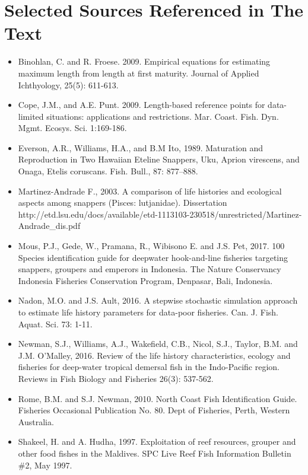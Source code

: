 \section{Selected Sources Referenced in The Text}
\begin{itemize}[noitemsep,topsep=0pt,parsep=0pt,partopsep=0pt]
\item Binohlan, C. and R. Froese. 2009. Empirical equations for estimating maximum length from length at first maturity. Journal of Applied Ichthyology, 25(5): 611-613.
\item Cope, J.M., and A.E. Punt. 2009. Length-based reference points for data-limited situations: applications and restrictions. Mar. Coast. Fish. Dyn. Mgmt. Ecosys. Sci. 1:169-186.
\item Everson, A.R., Williams, H.A., and B.M Ito, 1989. Maturation and Reproduction in Two Hawaiian Eteline Snappers, Uku, Aprion virescens, and Onaga, Etelis coruscans. Fish. Bull., 87: 877--888.
\item Martinez-Andrade F., 2003. A comparison of life histories and ecological aspects among snappers (Pisces: lutjanidae). Dissertation http://etd.lsu.edu/docs/available/etd-1113103-230518/unrestricted/Martinez-Andrade\_dis.pdf
\item Mous, P.J., Gede, W., Pramana, R., Wibisono E. and J.S. Pet, 2017. 100 Species identification guide for deepwater hook-and-line fisheries targeting snappers, groupers and emperors in Indonesia. The Nature Conservancy Indonesia Fisheries Conservation Program, Denpasar, Bali, Indonesia.
\item Nadon, M.O. and J.S. Ault, 2016. A stepwise stochastic simulation approach to estimate life history parameters for data-poor fisheries. Can. J. Fish. Aquat. Sci. 73: 1-11.
\item Newman, S.J., Williams, A.J., Wakefield, C.B., Nicol, S.J., Taylor, B.M. and J.M. O'Malley, 2016.    Review of the life history characteristics, ecology and fisheries for deep-water tropical demersal fish in the Indo-Pacific region. Reviews in Fish Biology and Fisheries 26(3): 537-562.
\item Rome, B.M. and S.J. Newman, 2010. North Coast Fish Identification Guide. Fisheries Occasional Publication No. 80. Dept of Fisheries, Perth, Western Australia.
\item Shakeel, H. and A. Hudha, 1997. Exploitation of reef resources, grouper and other food fishes in the Maldives. SPC Live Reef Fish Information Bulletin \#2, May 1997.

\end{itemize}